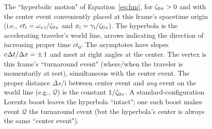 \documentclass[12pt]{article}
\begin{document}
\begin{figure}[h]
\caption{The ``hyperbolic motion" of Equation~\ref{eq:hm}, for $\zeta_{0 \mkern1mu x} > 0$ and with the center event conveniently placed at this frame's spacetime origin (i.e., $ct_{\mathrm{i}} = \omega_{x\,\mathrm{i}} / \zeta_{0 \mkern1mu x}$ and $x_{\mathrm{i}} = \gamma_{\mathrm{i}} / \zeta_{0 \mkern1mu x}$). The hyperbola is the accelerating traveler's world line, arrows indicating the direction of increasing proper time $ct_0$. The asymptotes have slopes $c\mkern.5mu\Delta t / \Delta x = \pm\,1$ and meet at right angles at the center. The vertex is this frame's ``turnaround event" (where/when the traveler is momentarily at rest), simultaneous with the center event. The proper distance $\Delta s / \mathrm{i}$ between center event and \emph{any} event on the world line (e.g., $\mathcal{Q}$) is the constant $1/\zeta_{0 \mkern1mu x}$. A standard-configuration Lorentz boost leaves the hyperbola ``intact"; one such boost makes event $\mathcal{Q}$ the turnaround event (but the hyperbola's center is always the same ``center event").}
\label{f:equilateralhyperbola}
\end{figure}
\end{document}
